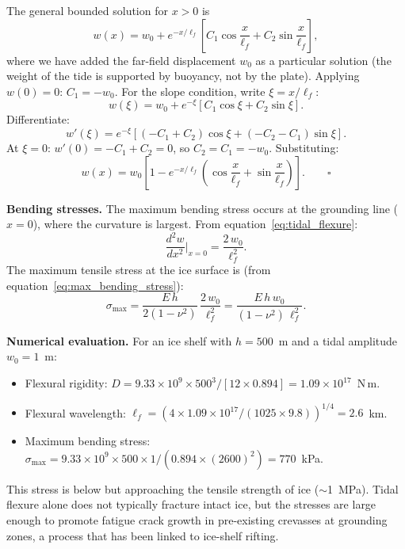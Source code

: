 \documentclass[11pt]{article}
\begin{document}
\begin{tcolorbox}[
  colback=orange!25,
  colframe=orange!70!black,
  title={\textbf{Derivation: tidal flexure profile}}
]
The general bounded solution for $x > 0$ is
\[
  w(x) = w_0 + e^{-x/\ell_f}\!\left[C_1\cos\frac{x}{\ell_f} + C_2\sin\frac{x}{\ell_f}\right],
\]
where we have added the far-field displacement $w_0$ as a particular solution (the weight of the tide is supported by buoyancy, not by the plate).  Applying $w(0) = 0$: $C_1 = -w_0$.  For the slope condition, write $\xi = x/\ell_f$:
\[
  w(\xi) = w_0 + e^{-\xi}\!\left[C_1\cos\xi + C_2\sin\xi\right].
\]
Differentiate:
\[
  w'(\xi) = e^{-\xi}\!\left[(-C_1 + C_2)\cos\xi + (-C_2 - C_1)\sin\xi\right].
\]
At $\xi = 0$: $w'(0) = -C_1 + C_2 = 0$, so $C_2 = C_1 = -w_0$.  Substituting:
\[
  w(x) = w_0\left[1 - e^{-x/\ell_f}\!\left(\cos\frac{x}{\ell_f} + \sin\frac{x}{\ell_f}\right)\right]. \qquad \square
\]
\end{tcolorbox}

\noindent\textbf{Bending stresses.}  The maximum bending stress occurs at the grounding line ($x = 0$), where the curvature is largest.  From equation~\eqref{eq:tidal_flexure}:
\begin{equation}
  \frac{d^2 w}{dx^2}\bigg|_{x=0} = \frac{2\,w_0}{\ell_f^2}.
  \label{eq:curvature_gl}
\end{equation}
The maximum tensile stress at the ice surface is (from equation~\eqref{eq:max_bending_stress}):
\begin{equation}
  \sigma_{\text{max}} = \frac{E\,h}{2(1-\nu^2)}\,\frac{2\,w_0}{\ell_f^2} = \frac{E\,h\,w_0}{(1-\nu^2)\,\ell_f^2}.
  \label{eq:stress_gl}
\end{equation}

\noindent\textbf{Numerical evaluation.}  For an ice shelf with $h = 500$~m and a tidal amplitude $w_0 = 1$~m:
\begin{itemize}
  \item Flexural rigidity: $D = 9.33 \times 10^9 \times 500^3 / [12 \times 0.894] = 1.09 \times 10^{17}$~N\,m.
  \item Flexural wavelength: $\ell_f = (4 \times 1.09 \times 10^{17} / (1025 \times 9.8))^{1/4} = 2.6$~km.
  \item Maximum bending stress: $\sigma_{\text{max}} = 9.33 \times 10^9 \times 500 \times 1 / (0.894 \times (2600)^2) = 770$~kPa.
\end{itemize}

\noindent This stress is below but approaching the tensile strength of ice ($\sim$1~MPa).  Tidal flexure alone does not typically fracture intact ice, but the stresses are large enough to promote fatigue crack growth in pre-existing crevasses at grounding zones, a process that has been linked to ice-shelf rifting.
\end{document}
